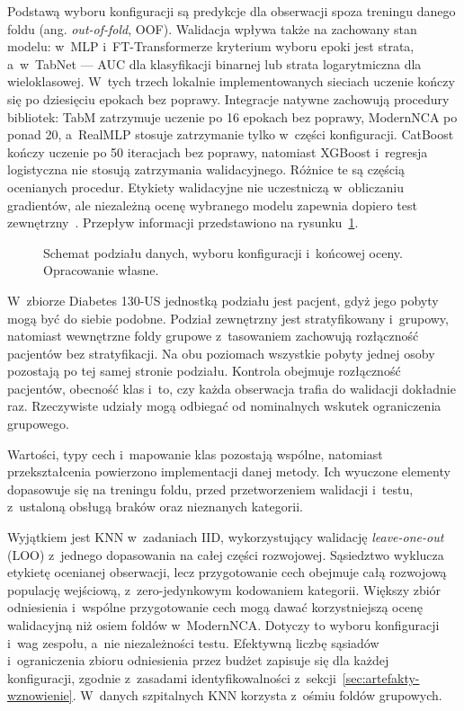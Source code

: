 Podstawą wyboru konfiguracji są predykcje dla obserwacji spoza treningu danego foldu (ang. \textit{out-of-fold}, OOF). Walidacja wpływa także na zachowany stan modelu: w~MLP i~FT-Transformerze kryterium wyboru epoki jest strata, a~w~TabNet --- AUC dla klasyfikacji binarnej lub strata logarytmiczna dla wieloklasowej. W~tych trzech lokalnie implementowanych sieciach uczenie kończy się po dziesięciu epokach bez poprawy. Integracje natywne zachowują procedury bibliotek: TabM zatrzymuje uczenie po 16 epokach bez poprawy, ModernNCA po ponad 20, a~RealMLP stosuje zatrzymanie tylko w~części konfiguracji. CatBoost kończy uczenie po 50 iteracjach bez poprawy, natomiast XGBoost i~regresja logistyczna nie stosują zatrzymania walidacyjnego. Różnice te są częścią ocenianych procedur. Etykiety walidacyjne nie uczestniczą w~obliczaniu gradientów, ale niezależną ocenę wybranego modelu zapewnia dopiero test zewnętrzny~\cite{cawley2010selection}. Przepływ informacji przedstawiono na rysunku~\ref{fig:podzial-selekcja}.

\begin{figure}[!htbp]\centering\small

\caption{Schemat podziału danych, wyboru konfiguracji i~końcowej oceny. Opracowanie własne.}
\label{fig:podzial-selekcja}
\end{figure}

W~zbiorze Diabetes 130-US jednostką podziału jest pacjent, gdyż jego pobyty mogą być do siebie podobne. Podział zewnętrzny jest stratyfikowany i~grupowy, natomiast wewnętrzne foldy grupowe z~tasowaniem zachowują rozłączność pacjentów bez stratyfikacji. Na obu poziomach wszystkie pobyty jednej osoby pozostają po tej samej stronie podziału. Kontrola obejmuje rozłączność pacjentów, obecność klas i~to, czy każda obserwacja trafia do walidacji dokładnie raz. Rzeczywiste udziały mogą odbiegać od nominalnych wskutek ograniczenia grupowego.

Wartości, typy cech i~mapowanie klas pozostają wspólne, natomiast przekształcenia powierzono implementacji danej metody. Ich wyuczone elementy dopasowuje się na treningu foldu, przed przetworzeniem walidacji i~testu, z~ustaloną obsługą braków oraz nieznanych kategorii.

Wyjątkiem jest KNN w~zadaniach IID, wykorzystujący walidację \textit{leave-one-out} (LOO) z~jednego dopasowania na całej części rozwojowej. Sąsiedztwo wyklucza etykietę ocenianej obserwacji, lecz przygotowanie cech obejmuje całą rozwojową populację wejściową, z~zero-jedynkowym kodowaniem kategorii. Większy zbiór odniesienia i~wspólne przygotowanie cech mogą dawać korzystniejszą ocenę walidacyjną niż osiem foldów w~ModernNCA. Dotyczy to wyboru konfiguracji i~wag zespołu, a~nie niezależności testu. Efektywną liczbę sąsiadów i~ograniczenia zbioru odniesienia przez budżet zapisuje się dla każdej konfiguracji, zgodnie z~zasadami identyfikowalności z~sekcji~\ref{sec:artefakty-wznowienie}. W~danych szpitalnych KNN korzysta z~ośmiu foldów grupowych.

